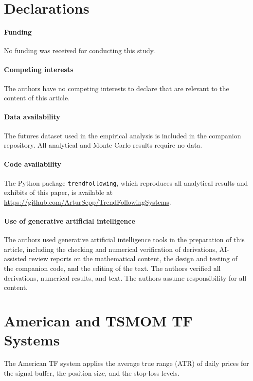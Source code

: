 \documentclass[hidelinks]{siamonline250211}
\begin{document}
\section*{Declarations}

\paragraph{Funding}
No funding was received for conducting this study.

\paragraph{Competing interests}
The authors have no competing interests to declare that are relevant to the content of this article.

\paragraph{Data availability}
The futures dataset used in the empirical analysis is included in the companion repository. All analytical and Monte Carlo results require no data.

\paragraph{Code availability}
The Python package \texttt{trendfollowing}, which reproduces all analytical results and exhibits of this paper, is available at \url{https://github.com/ArturSepp/TrendFollowingSystems}.

\paragraph{Use of generative artificial intelligence}
The authors used generative artificial intelligence tools in the preparation of this article, including the checking and numerical verification of derivations, AI-assisted review reports on the mathematical content, the design and testing of the companion code, and the editing of the text. The authors verified all derivations, numerical results, and text. The authors assume responsibility for all content.
\appendix

\section{American and TSMOM TF Systems}\label{app:tfs}

The American TF system applies the average true range (ATR) of daily prices for the signal buffer, the position size, and the stop-loss levels.
\end{document}
